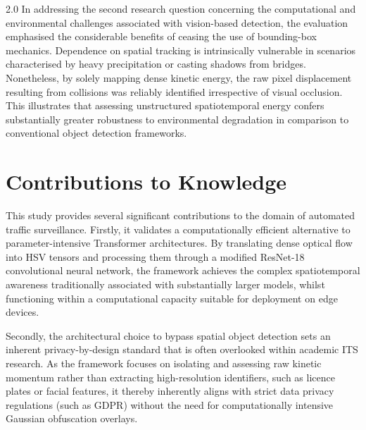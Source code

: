 \begin{spacing}{2.0}
In addressing the second research question concerning the computational and environmental challenges associated with vision-based detection, the evaluation emphasised the considerable benefits of ceasing the use of bounding-box mechanics. Dependence on spatial tracking is intrinsically vulnerable in scenarios characterised by heavy precipitation or casting shadows from bridges. Nonetheless, by solely mapping dense kinetic energy, the raw pixel displacement resulting from collisions was reliably identified irrespective of visual occlusion. This illustrates that assessing unstructured spatiotemporal energy confers substantially greater robustness to environmental degradation in comparison to conventional object detection frameworks.


\section{Contributions to Knowledge}
This study provides several significant contributions to the domain of automated traffic surveillance. Firstly, it validates a computationally efficient alternative to parameter-intensive Transformer architectures. By translating dense optical flow into HSV tensors and processing them through a modified ResNet-18 convolutional neural network, the framework achieves the complex spatiotemporal awareness traditionally associated with substantially larger models, whilst functioning within a computational capacity suitable for deployment on edge devices.

Secondly, the architectural choice to bypass spatial object detection sets an inherent privacy-by-design standard that is often overlooked within academic ITS research. As the framework focuses on isolating and assessing raw kinetic momentum rather than extracting high-resolution identifiers, such as licence plates or facial features, it thereby inherently aligns with strict data privacy regulations (such as GDPR) without the need for computationally intensive Gaussian obfuscation overlays.


\end{spacing}
